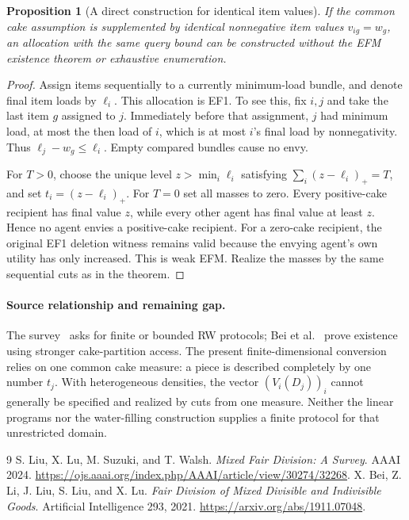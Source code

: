\documentclass[11pt]{article}
\newtheorem{proposition}{Proposition}
\theoremstyle{definition}
\theoremstyle{remark}
\begin{document}
\begin{proposition}[A direct construction for identical item values]
If the common cake assumption is supplemented by identical nonnegative item values $v_{ig}=w_g$, an allocation with the same query bound can be constructed without the EFM existence theorem or exhaustive enumeration.
\end{proposition}
\begin{proof}
Assign items sequentially to a currently minimum-load bundle, and denote final item loads by $\ell_i$. This allocation is EF1. To see this, fix $i,j$ and take the last item $g$ assigned to $j$. Immediately before that assignment, $j$ had minimum load, at most the then load of $i$, which is at most $i$'s final load by nonnegativity. Thus $\ell_j-w_g\leq\ell_i$. Empty compared bundles cause no envy.

For $T>0$, choose the unique level $z>\min_i\ell_i$ satisfying
$\sum_i(z-\ell_i)_+=T$, and set $t_i=(z-\ell_i)_+$. For $T=0$ set all masses to zero. Every positive-cake recipient has final value $z$, while every other agent has final value at least $z$. Hence no agent envies a positive-cake recipient. For a zero-cake recipient, the original EF1 deletion witness remains valid because the envying agent's own utility has only increased. This is weak EFM. Realize the masses by the same sequential cuts as in the theorem.
\end{proof}

\paragraph{Source relationship and remaining gap.}
The survey~\cite{survey} asks for finite or bounded RW protocols; Bei et al.~\cite{bei} prove existence using stronger cake-partition access. The present finite-dimensional conversion relies on one common cake measure: a piece is described completely by one number $t_j$. With heterogeneous densities, the vector $(V_i(D_j))_i$ cannot generally be specified and realized by cuts from one measure. Neither the linear programs nor the water-filling construction supplies a finite protocol for that unrestricted domain.

\begin{thebibliography}{9}
 S. Liu, X. Lu, M. Suzuki, and T. Walsh.
\emph{Mixed Fair Division: A Survey}. AAAI 2024.
\url{https://ojs.aaai.org/index.php/AAAI/article/view/30274/32268}.
 X. Bei, Z. Li, J. Liu, S. Liu, and X. Lu.
\emph{Fair Division of Mixed Divisible and Indivisible Goods}. Artificial Intelligence 293, 2021.
\url{https://arxiv.org/abs/1911.07048}.
\end{thebibliography}
\end{document}
